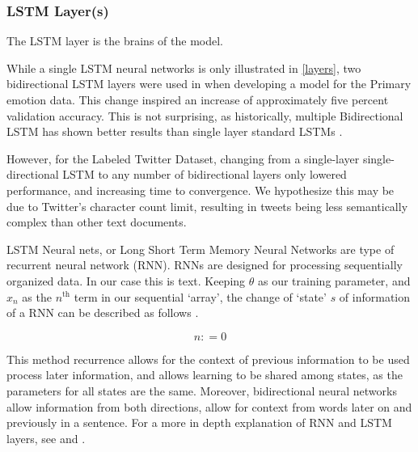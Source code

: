 \documentclass[titlepage,letterpaper]{article}
\begin{document}
 \subsubsection{LSTM Layer(s)}

The LSTM layer is the brains of the model.

While a single LSTM neural networks is only illustrated in \cref{layers},  two bidirectional LSTM layers were used in when developing a model for the Primary emotion data. This change inspired an increase of approximately five percent validation accuracy. This is not surprising, as historically, multiple Bidirectional LSTM has shown better results than single layer standard LSTMs \cite{Keras.io,deep_bi}. 

However, for the Labeled Twitter Dataset, changing from a single-layer single-directional LSTM to any number of bidirectional layers  only lowered performance,  and increasing time to convergence.  We hypothesize this may be due to Twitter's character count limit, resulting in tweets being less semantically complex than other text documents.

LSTM Neural nets, or Long Short Term Memory Neural Networks are type of recurrent neural network (RNN). RNNs are designed for processing sequentially organized data. In our case this is text. Keeping \(\theta\) as our training parameter, and \(x_n\) as the \( n^\text{th}\) term in our sequential `array', the change of `state' \(s\) of information of a RNN can be described as follows  \cite{NeuralNet}.

\begin{algorithm}[]
	\[n \mathrel{{:}{=}} 0\] 
\end{algorithm}

This method recurrence allows for the context of previous information to be used process later information, and allows learning to be shared among states, as the parameters for all states are the same. Moreover, bidirectional neural networks allow information from both directions, allow for context from words later on and previously in a sentence.
For a more in depth explanation of RNN and LSTM layers, see \textcite{NeuralNet} and \textcite{graves}.
\end{document}
